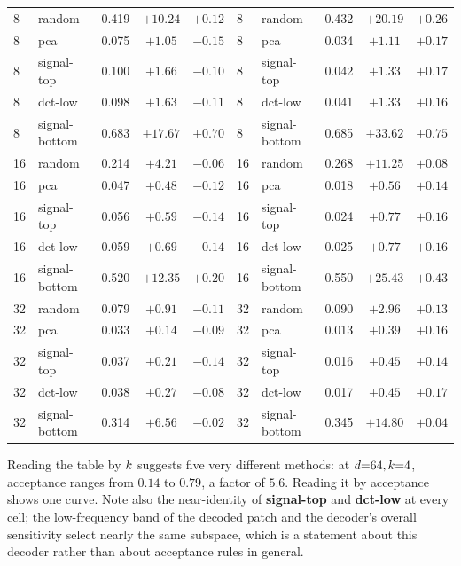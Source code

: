 \begin{center}
\begin{tabular}{llccc|llccc}
\midrule
8 & random        & 0.419 & $+10.24$ & $+0.12$ & 8 & random        & 0.432 & $+20.19$ & $+0.26$ \\
8 & pca           & 0.075 & $+1.05$ & $-0.15$ & 8 & pca           & 0.034 & $+1.11$ & $+0.17$ \\
8 & signal-top    & 0.100 & $+1.66$ & $-0.10$ & 8 & signal-top    & 0.042 & $+1.33$ & $+0.17$ \\
8 & dct-low       & 0.098 & $+1.63$ & $-0.11$ & 8 & dct-low       & 0.041 & $+1.33$ & $+0.16$ \\
8 & signal-bottom & 0.683 & $+17.67$ & $+0.70$ & 8 & signal-bottom & 0.685 & $+33.62$ & $+0.75$ \\
\midrule
16 & random        & 0.214 & $+4.21$ & $-0.06$ & 16 & random        & 0.268 & $+11.25$ & $+0.08$ \\
16 & pca           & 0.047 & $+0.48$ & $-0.12$ & 16 & pca           & 0.018 & $+0.56$ & $+0.14$ \\
16 & signal-top    & 0.056 & $+0.59$ & $-0.14$ & 16 & signal-top    & 0.024 & $+0.77$ & $+0.16$ \\
16 & dct-low       & 0.059 & $+0.69$ & $-0.14$ & 16 & dct-low       & 0.025 & $+0.77$ & $+0.16$ \\
16 & signal-bottom & 0.520 & $+12.35$ & $+0.20$ & 16 & signal-bottom & 0.550 & $+25.43$ & $+0.43$ \\
\midrule
32 & random        & 0.079 & $+0.91$ & $-0.11$ & 32 & random        & 0.090 & $+2.96$ & $+0.13$ \\
32 & pca           & 0.033 & $+0.14$ & $-0.09$ & 32 & pca           & 0.013 & $+0.39$ & $+0.16$ \\
32 & signal-top    & 0.037 & $+0.21$ & $-0.14$ & 32 & signal-top    & 0.016 & $+0.45$ & $+0.14$ \\
32 & dct-low       & 0.038 & $+0.27$ & $-0.08$ & 32 & dct-low       & 0.017 & $+0.45$ & $+0.17$ \\
32 & signal-bottom & 0.314 & $+6.56$ & $-0.02$ & 32 & signal-bottom & 0.345 & $+14.80$ & $+0.04$ \\
\bottomrule
\end{tabular}
\end{center}

Reading the table by $k$ suggests five very different methods: at $d{=}64, k{=}4$, acceptance
ranges from $0.14$ to $0.79$, a factor of $5.6$. Reading it by acceptance shows one curve. Note also
the near-identity of \textbf{signal-top} and \textbf{dct-low} at every cell; the low-frequency band of
the decoded patch and the decoder's overall sensitivity select nearly the same subspace, which is a
statement about this decoder rather than about acceptance rules in general.

